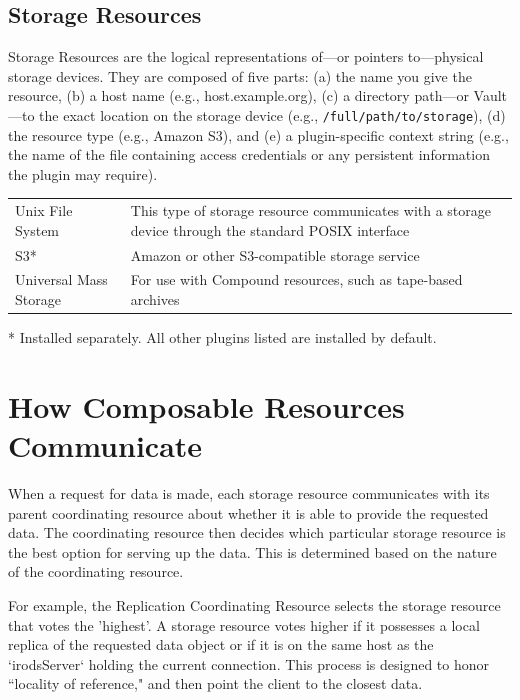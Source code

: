\documentclass[10pt,oneside]{memoir}
\begin{document}
\subsection{Storage Resources}

Storage Resources are the logical representations of---or pointers to---physical storage devices. They are composed of five parts: (a) the name you give the resource, (b) a host name (e.g., host.example.org), (c) a directory path---or Vault---to the exact location on the storage device (e.g., \texttt{/full/path/to/storage}), (d) the resource type (e.g., Amazon S3), and (e) a plugin-specific context string (e.g., the name of the file containing access credentials or any persistent information the plugin may require).

\begin{center}
\def\arraystretch{1.5}%
\begin{tabular}{ |l|p{10cm}| }
\hline
Unix File System & This type of storage resource communicates with a storage device through the standard POSIX interface \\
S3* & Amazon or other S3-compatible storage service \\
Universal Mass Storage & For use with Compound resources, such as tape-based archives \\
\hline
\end{tabular}
\end{center}
\footnotesize\vspace{-5mm}\hspace{3mm}* Installed separately. All other plugins listed are installed by default.
\normalsize

\section{How Composable Resources Communicate}

When a request for data is made, each storage resource communicates with its parent coordinating resource about whether it is able to provide the requested data. The coordinating resource then decides which particular storage resource is the best option for serving up the data. This is determined based on the nature of the coordinating resource.

For example, the Replication Coordinating Resource selects the storage resource that votes the 'highest'.  A storage resource votes higher if it possesses a local replica of the requested data object or if it is on the same host as the `irodsServer` holding the current connection. This process is designed to honor ``locality of reference," and then point the client to the closest data.
\end{document}
